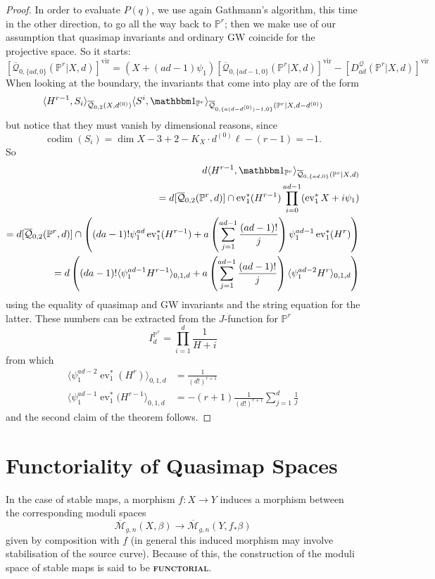 \documentclass[11pt]{amsart}
\newcommand{\M}[4]{\overline{\mathcal M}_{#1,#2}(#3,#4)}
\newcommand{\Q}[4]{\overline{\mathcal Q}_{#1,#2}(#3,#4)}
\newcommand{\PP}{\mathbb P}
\renewcommand{\to}{\rightarrow}
\newcommand{\ev}{\operatorname{ev}}
\newcommand{\codim}{\operatorname{codim}}
\newcommand{\ildef}[1]{\textbf{\textsc{#1}}}
\theoremstyle{plain}
\theoremstyle{definition}
\begin{document}
\begin{proof}
In order to evaluate $P(q)$, we use again Gathmann's algorithm, this time in the other direction, to go all the way back to $\PP^r$; then we make use of our assumption that quasimap invariants and ordinary GW coincide for the projective space. So it starts:
\[
 [\Q{0}{\{ad,0\}}{\PP^r|X}{d}]^\text{vir}=(X+(ad-1)\psi_1)[\Q{0}{\{ad-1,0\}}{\PP^r|X}{d}]^\text{vir}-[D_{ad}^{\mathcal Q}(\PP^r|X,d)]^\text{vir}
\]
When looking at the boundary, the invariants that come into play are of the form
\[
 \langle H^{r-1},S_i\rangle_{\Q{0}{2}{X}{d^{(0)}}}\langle S^i,\mathbbm 1_{\PP^r}\rangle_{\Q{0}{\{a(d-d^{(0)})-1,0\}}{\PP^r|X}{d-d^{(0)}}}
\]
but notice that they must vanish by dimensional reasons, since
\[
 \codim(S_i)=\dim X-3+2-K_X\cdot d^{(0)}\ell-(r-1)=-1.
\]
So
\begin{align*}
 d\langle H^{r-1},\mathbbm 1_{\PP^r}\rangle_{\Q{0}{\{ad,0\}}{\PP^r|X}{d}} \\
 = d[\Q{0}{2}{\PP^r}{d}]\cap\ev_1^*(H^{r-1})\prod_{i=0}^{ad-1}(\ev_1^*X+i\psi_1) \\
 = d[\Q{0}{2}{\PP^r}{d}]\cap\left((da-1)!\psi_1^{ad}\ev_1^*(H^{r-1})+a\left(\sum_{j=1}^{ad-1}\frac{(ad-1)!}{j}\right)\psi_1^{ad-1}\ev_1^*(H^{r})\right) \\
 = d\left((da-1)!\langle \psi_1^{ad-1}H^{r-1}\rangle_{0,1,d}+a\left(\sum_{j=1}^{ad-1}\frac{(ad-1)!}{j}\right)\langle\psi_1^{ad-2}H^{r}\rangle_{0,1,d}\right)
\end{align*}
using the equality of quasimap and GW invariants and the string equation for the latter. These numbers can be extracted from the $J$-function for $\PP^r$
\[
 I^{\PP^r}_d=\prod_{i=1}^d\frac{1}{H+i}
\]
from which
\begin{align*}
 \langle \psi_1^{ad-2}\ev_1^*(H^{r})\rangle_{0,1,d} &=\frac{1}{(d!)^{r+1}} \\
 \langle \psi_1^{ad-1}\ev_1^*(H^{r-1}\rangle_{0,1,d} &=-(r+1)\frac{1}{(d!)^{r+1}}\sum_{j=1}^d\frac{1}{j}
\end{align*}
and the second claim of the theorem follows.
\end{proof}

\appendix
\section{Functoriality of Quasimap Spaces} \label{Functoriality of Quasimap Spaces Section}

In the case of stable maps, a morphism $f : X \to Y$ induces a morphism between the corresponding moduli spaces
\begin{equation*}\M{g}{n}{X}{\beta} \rightarrow \M{g}{n}{Y}{f_* \beta} \end{equation*}
given by composition with $f$ (in general this induced morphism may involve stabilisation of the source curve). Because of this, the construction of the moduli space of stable maps is said to be \ildef{functorial}.
\end{document}

